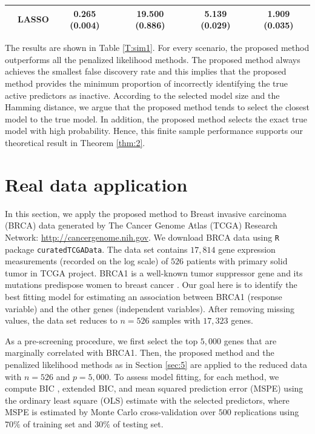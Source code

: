 \documentclass[twocolumn]{svjour3}       %
\newcommand{\0}{\boldsymbol 0} %
\newcommand{\1}{\boldsymbol 1} %
\begin{document}
{\begin{table}[H]
\begin{tabular}{cccccc}
           & LASSO                          & 0.265 (0.004)  & 19.500 (0.886)  & 5.139 (0.029)   & 1.909 (0.035) \\
\hline
\end{tabular}
\end{table}
The results are shown in Table \ref{T:sim1}. For every scenario, the proposed method outperforms all the penalized likelihood methods. The proposed method always achieves the smallest false discovery rate and this implies that the proposed method provides the minimum proportion of incorrectly identifying the true active predictors as inactive. According to the selected model size and the Hamming distance, we argue that the proposed method tends to select the closest model to the true model. In addition, the proposed method selects the exact true model with high probability. Hence, this finite sample performance supports our theoretical result in Theorem \ref{thm:2}.
\section{Real data application}
In this section, we apply the proposed method to Breast invasive carcinoma (BRCA) data generated by The Cancer Genome Atlas (TCGA) Research Network: \url{http://cancergenome.nih.gov}. We download BRCA data using \texttt{R} package \texttt{curatedTCGAData}. The data set contains $17,814$ gene expression measurements (recorded on the log scale) of $526$ patients with primary solid tumor in TCGA project. BRCA1 is a well-known tumor suppressor gene and its mutations predispose women to breast cancer \cite{findlay2018accurate}. Our goal here is to identify the best fitting model for estimating an association between BRCA1 (response variable) and the other genes (independent variables). After removing missing values, the data set reduces to $n=526$ samples with $17,323$ genes.

As a pre-screening procedure, we first select the top $5,000$ genes that are marginally correlated with BRCA1. Then, the proposed method and the penalized likelihood methods as in Section \ref{sec:5} are applied to the reduced data with $n=526$ and $p=5,000$. To assess model fitting, for each method, we compute BIC \cite{schwarz1978}, extended BIC, and mean squared prediction error (MSPE) using the ordinary least square (OLS) estimate with the selected predictors, where MSPE is estimated by Monte Carlo cross-validation over $500$ replications using $70\%$ of training set and $30\%$ of testing set. 

}
\end{document}
